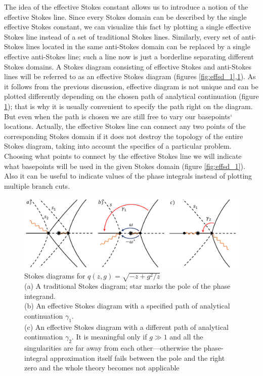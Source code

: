 \documentclass[atmp]{ipart_v1}
\newcommand\fref[1]{figure \ref{#1}}
\begin{document}
The idea of the effective Stokes constant allows us to introduce a notion of the effective Stokes line.
Since every Stokes domain can be described by the single effective Stokes constant, we can visualize this fact 
by plotting a single effective Stokes line instead of a set of traditional Stokes lines. 
Similarly, every set of anti-Stokes lines located in the same anti-Stokes
domain can be replaced by a single effective anti-Stokes line; such a line now is just a borderline 
separating different Stokes domains. A Stokes diagram consisting of effective Stokes and anti-Stokes 
lines will be referred to as an effective Stokes diagram (figures \ref{fig:effsd_1},\ref{fig:effsd_2}). 
As it follows from the previous discussion, effective diagram is not unique
and can be plotted differently depending on the chosen path of analytical continuation (\fref{fig:effsd_2}); 
that is why it is usually convenient to specify the path right on the diagram. But even when the path is chosen we
are still free to vary our basepoints` locations. Actually, the effective Stokes line can connect any two 
points of the corresponding Stokes domain if it does not destroy the topology of the entire 
Stokes diagram, taking into account the specifics of a particular problem. 
Choosing what points to connect by the effective Stokes line we will indicate what basepoints 
will be used in the given Stokes domain (\fref{fig:effsd_1}). Also it can be useful to indicate 
values of the phase integrals instead of plotting multiple branch cuts.


\begin{figure}
\centering
\noindent
\includegraphics[width=\textwidth]{stuff/effsd_2.png}
\caption{
Stokes diagrams for $q(z,g)=\sqrt{-z + g^2/z}$
\\
(a) A traditional Stokes diagram; star marks the pole of the phase integrand. 
\\
(b) An effective Stokes diagram with a specified path of analytical continuation $\gamma_1$. 
\\
(c) An effective Stokes diagram with a different path of analytical continuation $\gamma_2$.
It is meaningful only if $g \gg 1$ and all the singularities are far away from each other---otherwise 
the phase-integral approximation itself fails between the pole and the right zero and the whole theory
becomes not applicable}
\label{fig:effsd_2}
\end{figure}  
\end{document}

